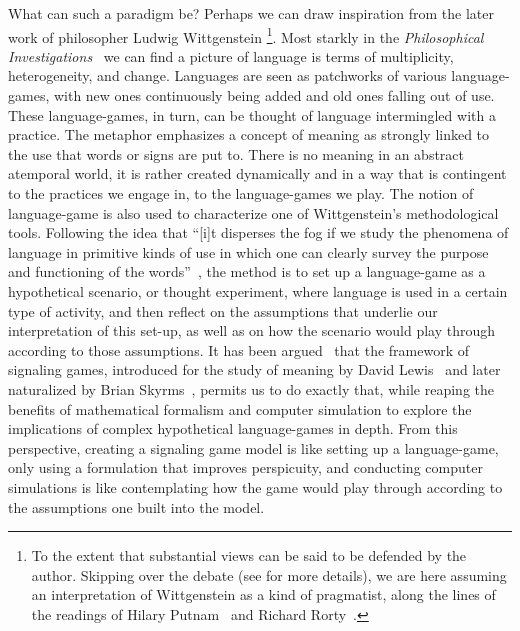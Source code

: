 \documentclass[a4paper]{article}
\begin{document}
What can such a paradigm be?
Perhaps we can draw inspiration from the later work of philosopher Ludwig Wittgenstein%
\footnote{To the extent that substantial views can be said to be defended by the author. Skipping over the debate (see \cite{kahane_wittgenstein_2007} for more details), we are here assuming an interpretation of Wittgenstein as a kind of pragmatist, along the lines of the readings of Hilary Putnam~\parencite*{putnam_pragmatism_1994} and Richard Rorty~\parencite*{rorty_wittgenstein_2007}.}.
Most starkly in the \emph{Philosophical Investigations}~\parencite*{wittgenstein_philosophical_1953} we can find a picture of language is terms of multiplicity, heterogeneity, and change.
Languages are seen as patchworks of various language-games, with new ones continuously being added and old ones falling out of use.
These language-games, in turn, can be thought of language intermingled with a practice.
The metaphor emphasizes a concept of meaning as strongly linked to the use that words or signs are put to.
There is no meaning in an abstract atemporal world, it is rather created dynamically and in a way that is contingent to the practices we engage in, to the language-games we play.
The notion of language-game is also used to characterize one of Wittgenstein's methodological tools.
Following the idea that ``[i]t disperses the fog if we study the phenomena of language in primitive kinds of use in which one can clearly survey the purpose and functioning of the words''~\parencite*[\S 5]{wittgenstein_philosophical_1953}, the method is to set up a language-game as a hypothetical scenario, or thought experiment, where language is used in a certain type of activity, and then reflect on the assumptions that underlie our interpretation of this set-up, as well as on how the scenario would play through according to those assumptions.
It has been argued~\parencite{correia_bivalent_2013} that the framework of signaling games, introduced for the study of meaning by David Lewis~\parencite*{lewis_convention_1969} and later naturalized by Brian Skyrms~\parencite*{skyrms_evolution_1996,skyrms_signals_2010}, permits us to do exactly that, while reaping the benefits of mathematical formalism and computer simulation to explore the implications of complex hypothetical language-games in depth.
From this perspective, creating a signaling game model is like setting up a language-game, only using a formulation that improves perspicuity, and conducting computer simulations is like contemplating how the game would play through according to the assumptions one built into the model.
\end{document}
